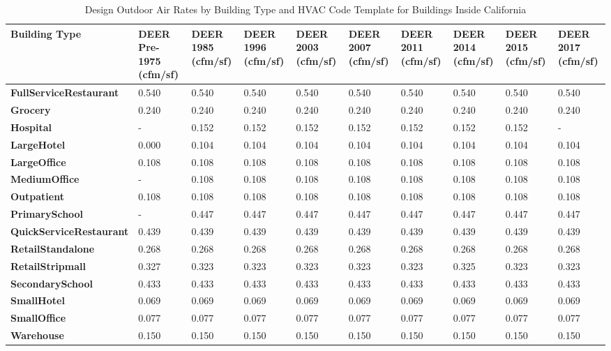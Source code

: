 \begin{table}
\small
\centering
\caption[Design Outdoor Air Rates---Inside California]{Design Outdoor Air Rates by Building Type and HVAC Code Template for Buildings Inside California}
\label{tab:outdoor_air_table_deer}
\begin{tabular}{|p{1in}|p{0.4in}|p{0.4in}|p{0.4in}|p{0.4in}|p{0.4in}|p{0.4in}|p{0.4in}|p{0.4in}|p{0.4in}|}
\hline
\textbf{Building   Type} &
  \textbf{DEER Pre-1975 (cfm/sf)} &
  \textbf{DEER 1985 (cfm/sf)} &
  \textbf{DEER 1996 (cfm/sf)} &
  \textbf{DEER 2003 (cfm/sf)} &
  \textbf{DEER 2007 (cfm/sf)} &
  \textbf{DEER 2011 (cfm/sf)} &
  \textbf{DEER 2014 (cfm/sf)} &
  \textbf{DEER 2015 (cfm/sf)} &
  \textbf{DEER 2017 (cfm/sf)} \\ \hline
\textbf{FullService\-Restaurant}  & 0.540 & 0.540 & 0.540 & 0.540 & 0.540 & 0.540 & 0.540 & 0.540 & 0.540 \\ \hline
\textbf{Grocery}                 & 0.240 & 0.240 & 0.240 & 0.240 & 0.240 & 0.240 & 0.240 & 0.240 & 0.240 \\ \hline
\textbf{Hospital}                 & -     & 0.152 & 0.152 & 0.152 & 0.152 & 0.152 & 0.152 & 0.152 & -     \\ \hline
\textbf{LargeHotel}               & 0.000 & 0.104 & 0.104 & 0.104 & 0.104 & 0.104 & 0.104 & 0.104 & 0.104 \\ \hline
\textbf{LargeOffice}              & 0.108 & 0.108 & 0.108 & 0.108 & 0.108 & 0.108 & 0.108 & 0.108 & 0.108 \\ \hline
\textbf{MediumOffice}             & -     & 0.108 & 0.108 & 0.108 & 0.108 & 0.108 & 0.108 & 0.108 & 0.108 \\ \hline
\textbf{Outpatient}               & 0.108 & 0.108 & 0.108 & 0.108 & 0.108 & 0.108 & 0.108 & 0.108 & 0.108 \\ \hline
\textbf{PrimarySchool}            & -     & 0.447 & 0.447 & 0.447 & 0.447 & 0.447 & 0.447 & 0.447 & 0.447 \\ \hline
\textbf{QuickService\-Restaurant} & 0.439 & 0.439 & 0.439 & 0.439 & 0.439 & 0.439 & 0.439 & 0.439 & 0.439 \\ \hline
\textbf{RetailStandalone}         & 0.268 & 0.268 & 0.268 & 0.268 & 0.268 & 0.268 & 0.268 & 0.268 & 0.268 \\ \hline
\textbf{RetailStripmall}          & 0.327 & 0.323 & 0.323 & 0.323 & 0.323 & 0.323 & 0.325 & 0.323 & 0.323 \\ \hline
\textbf{SecondarySchool}          & 0.433 & 0.433 & 0.433 & 0.433 & 0.433 & 0.433 & 0.433 & 0.433 & 0.433 \\ \hline
\textbf{SmallHotel}               & 0.069 & 0.069 & 0.069 & 0.069 & 0.069 & 0.069 & 0.069 & 0.069 & 0.069 \\ \hline
\textbf{SmallOffice}              & 0.077 & 0.077 & 0.077 & 0.077 & 0.077 & 0.077 & 0.077 & 0.077 & 0.077 \\ \hline
\textbf{Warehouse}                & 0.150 & 0.150 & 0.150 & 0.150 & 0.150 & 0.150 & 0.150 & 0.150 & 0.150 \\ \hline
\end{tabular}
\end{table}
